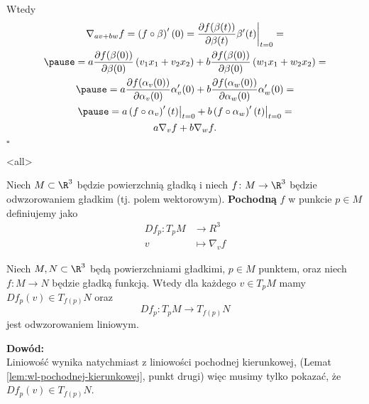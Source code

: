 \begin{frame}[<+->]

Wtedy 
\begin{multline*}
\nabla_{av+bw}f=\left(f\circ \beta\right)'(0)=\frac{\partial f(\beta(t))}{\partial \beta(t)}\beta'(t)\bigg|_{t=0}=\\\pause
=a\frac{\partial f(\beta(0))}{\partial \beta(0)}\left(v_1 x_1+v_2 x_2\right)+b\frac{\partial f(\beta(0))}{\partial \beta(0)}\left(w_1 x_1+w_2 x_2\right)=\\\pause
=a\frac{\partial f(\alpha_v(0))}{\partial \alpha_v(0)}\alpha_v'(0)+b\frac{\partial f(\alpha_w(0))}{\partial \alpha_w(0)}\alpha_w'(0)=\\\pause
=a\left(f\circ \alpha_v\right)'(t)\big|_{t=0}+b\left(f\circ \alpha_w\right)'(t)\big|_{t=0}=\\a\nabla_vf+b\nabla_wf.
\end{multline*}
\hfill $\square$

\end{frame}
\mode<all>{}
\begin{frame}[<+->]

\begin{definicja}
Niech $M\subset \R^3$ będzie powierzchnią gładką i niech $f\colon M\to \R^3$ będzie odwzorowaniem gładkim (tj. polem wektorowym). \textbf{Pochodną} $f$ w punkcie $p\in M$ definiujemy jako
\begin{align*}
Df_p\colon T_pM&\to R^3\\
v&\mapsto \nabla_v f
\end{align*}
\end{definicja}

\end{frame}
\begin{frame}

\begin{lemat}
Niech $M,N\subset \R^3$ będą powierzchniami gładkimi, $p\in M$ punktem, oraz niech $f\colon M\to N$ będzie gładką funkcją. Wtedy dla każdego $v\in T_pM$ mamy $Df_p(v)\in T_{f(p)}N$ oraz \[Df_p\colon T_pM\to T_{f(p)}N\] jest odwzorowaniem liniowym.

\end{lemat}

\pause \textcolor{ared}{\textbf{Dowód:}}\\\pause
Liniowość wynika natychmiast z liniowości pochodnej kierunkowej, (Lemat \ref{lem:wl-pochodnej-kierunkowej}, punkt drugi) więc musimy tylko pokazać, że $Df_p(v)\in T_{f(p)}N$.

\end{frame}
